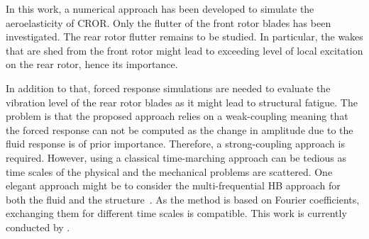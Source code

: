 In this work, a numerical approach has been developed to
simulate the aeroelasticity of CROR. Only the flutter of the
front rotor blades has been investigated. The rear rotor
flutter remains to be studied. In particular, the wakes that are
shed from the front rotor might lead to exceeding level of
local excitation on the rear rotor, hence its importance.

In addition to that, forced
response simulations are needed to evaluate the vibration
level of the rear rotor blades as it might lead
to structural fatigue.
The problem is that the
proposed approach relies on a weak-coupling meaning
that the forced response can not be computed as the
change in amplitude due to the fluid response is of
prior importance. Therefore, a strong-coupling approach
is required. However, using a classical time-marching approach
can be tedious as time scales of the physical 
and the mechanical problems are scattered. One elegant approach might
be to consider the multi-frequential HB approach for both the
fluid and the structure~\cite{Salles2011}. 
As the method is based on Fourier coefficients,
exchanging them for different time scales is compatible.
This work is currently conducted by \citet{ThesisCadel}.
